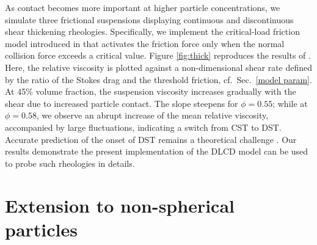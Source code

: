 As contact becomes more important at higher particle concentrations, we simulate three frictional suspensions displaying continuous and discontinuous shear thickening rheologies. Specifically, we implement the critical-load friction model introduced in \cite{Mari_Seto_2014JoR} that activates the friction force only when the normal collision force exceeds a critical value. Figure \ref{fig:thick} reproduces the results of \cite{Mari_Seto_2014JoR}. Here, the relative viscosity is plotted against a non-dimensional shear rate defined by the ratio of the Stokes drag and the threshold friction, cf.\ Sec.\ \ref{model param}. At 45\% volume fraction, the suspension viscosity increases gradually with the shear due to increased particle contact. The slope steepens for $\phi=0.55$; while at $\phi=0.58$, we observe an abrupt increase of the mean relative viscosity, accompanied by large fluctuations, indicating a switch from CST to DST. Accurate prediction of the onset of DST remains a theoretical challenge \citep{Morris_annurev2020}. Our results demonstrate the present implementation of the DLCD model can be used to probe such rheologies in details.





\section{Extension to non-spherical particles}
\label{sec:nonsph}

